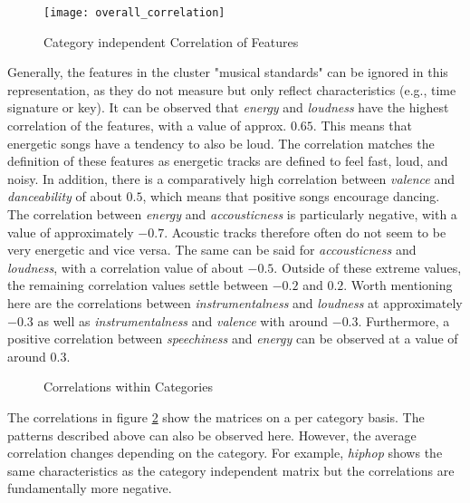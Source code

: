 \begin{figure}[H]
    \centering
    \caption[]{Category independent Correlation of Features}
	\label{fig:du_cm_overall}
    \texttt{[image: overall\_correlation]}
\end{figure}

Generally, the features in the cluster "musical standards" can be ignored in this representation,
as they do not measure but only reflect characteristics (e.g., time signature or key).
It can be observed that \emph{energy} and \emph{loudness} have the highest correlation of the features,
with a value of approx. \(0.65\).  
This means that energetic songs have a tendency to also be loud.
The correlation matches the definition of these features as energetic tracks are defined to feel fast, loud, and noisy.
In addition, there is a comparatively high correlation between \emph{valence} and \emph{danceability} of
about \(0.5\), which means that positive songs encourage dancing.
The correlation between \emph{energy} and \emph{accousticness} is particularly negative, with a value of approximately \(-0.7\).
Acoustic tracks therefore often do not seem to be very energetic and vice versa.
The same can be said for \emph{accousticness} and \emph{loudness}, with a correlation value of about \(-0.5\).
Outside of these extreme values, the remaining correlation values settle between \(-0.2\) and \(0.2\).
Worth mentioning here are the correlations between \emph{instrumentalness} and \emph{loudness} at
approximately \(-0.3\) as well as \emph{instrumentalness} and \emph{valence} with around \(-0.3\).
Furthermore, a positive correlation between \emph{speechiness} and \emph{energy} can be observed at a value of around \(0.3\).

\begin{figure}[H]
    \centering
    \qquad
    \qquad
    \caption{Correlations within Categories}%
    \label{fig:du_cm_categorie_dependent}%
\end{figure}

The correlations in figure \ref{fig:du_cm_categorie_dependent} show the matrices on a per category basis.
The patterns described above can also be observed here.
However, the average correlation changes depending on the category.
For example, \emph{hiphop} shows the same characteristics as the category independent matrix but
the correlations are fundamentally more negative.

